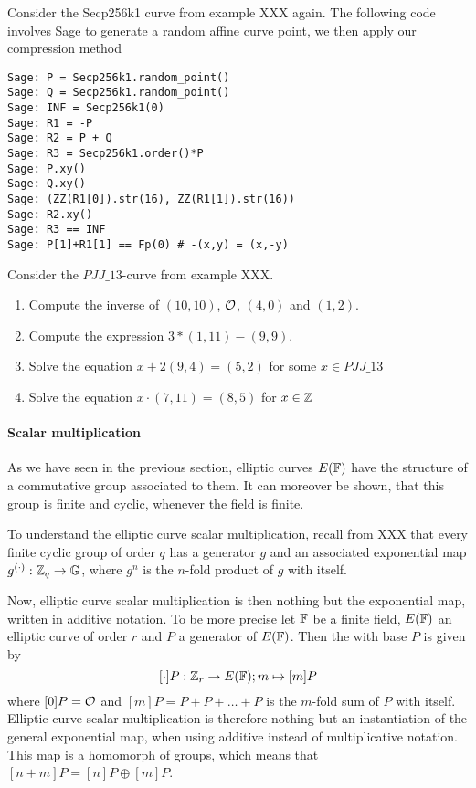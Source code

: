 \begin{example}
Consider the Secp256k1 curve from example XXX again. The following code involves Sage to generate a random affine curve point, we then apply our compression method   
\begin{verbatim}
Sage: P = Secp256k1.random_point()
Sage: Q = Secp256k1.random_point()
Sage: INF = Secp256k1(0)
Sage: R1 = -P
Sage: R2 = P + Q
Sage: R3 = Secp256k1.order()*P
Sage: P.xy()
Sage: Q.xy()
Sage: (ZZ(R1[0]).str(16), ZZ(R1[1]).str(16))
Sage: R2.xy()
Sage: R3 == INF
Sage: P[1]+R1[1] == Fp(0) # -(x,y) = (x,-y)
\end{verbatim}
\end{example}
\begin{exercise}
Consider the $\mathit{PJJ\_13}$-curve from example XXX. 
\begin{enumerate}
\item Compute the inverse of $(10,10)$, $\mathcal{O}$, $(4,0)$ and $(1,2)$.
\item Compute the expression $3*(1,11) - (9,9)$.
\item Solve the equation $x + 2(9,4) = (5,2) $ for some $x\in \mathit{PJJ\_13}$
\item Solve the equation $x\cdot (7,11) = (8,5)$ for $x\in \mathbb{Z}$
\end{enumerate}
\end{exercise}
\paragraph{Scalar multiplication}
As we have seen in the previous section, elliptic curves $E(\mathbb{F})$ have the structure of a commutative group associated to them. It can moreover be shown, that this group is finite and cyclic, whenever the field is finite. 

To understand the elliptic curve scalar multiplication, recall from XXX that every finite cyclic group of order $q$ has a generator $g$ and an associated exponential map $g^{(\cdot)}: \mathbb{Z}_q \to \mathbb{G}$, where $g^n$ is the $n$-fold product of $g$ with itself.  

Now, elliptic curve scalar multiplication is then nothing but the exponential map, written in additive notation. To be more precise let $\mathbb{F}$ be a finite field, $E(\mathbb{F})$ an elliptic curve of order $r$ and $P$ a generator of $E(\mathbb{F})$. Then the  with base $P$ is given by
$$
[\cdot]P: \mathbb{Z}_r \to E(\mathbb{F}); m \mapsto [m]P
$$
where $[0]P = \mathcal{O}$ and $[m]P = P+P+\ldots + P$ is the $m$-fold sum of $P$ with itself. Elliptic curve scalar multiplication is therefore nothing but an instantiation of the general exponential map, when using additive instead of multiplicative notation. This map is a homomorph of groups, which means that $[n+m]P = [n]P \oplus [m]P$. 

